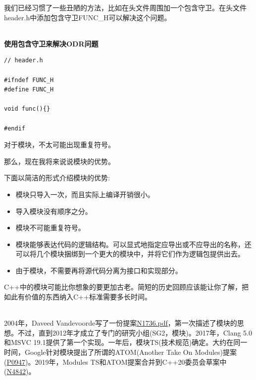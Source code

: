 我们已经习惯了一些丑陋的方法，比如在头文件周围加一个包含守卫。在头文件header.h中添加包含守卫FUNC\_H可以解决这个问题。

\hspace*{\fill} \\ %
\noindent
\textbf{使用包含守卫来解决ODR问题}
\begin{lstlisting}[style=styleCXX]
// header.h

#ifndef FUNC_H
#define FUNC_H

void func(){}

#endif
\end{lstlisting}

对于模块，不太可能出现重复符号。

那么，现在我将来说说模块的优势。


下面以简洁的形式介绍模块的优势:

\begin{itemize}
\item 
模块只导入一次，而且实际上编译开销很小。

\item 
导入模块没有顺序之分。

\item 
模块不可能重复符号。

\item 
模块能够表达代码的逻辑结构。可以显式地指定应导出或不应导出的名称，还可以将几个模块捆绑到一个更大的模块中，并将它们作为逻辑包提供出去。

\item 
由于模块，不需要再将源代码分离为接口和实现部分。
\end{itemize}

\begin{tcolorbox}[breakable,enhanced jigsaw,colback=blue!5!white,colframe=blue!75!black,title=常规类型]
C++中的模块可能比你想象的要更加古老。简短的历史回顾应该能让你了解，把如此有价值的东西纳入C++标准需要多长时间。

\hspace*{\fill} \\ %
2004年，Daveed Vandevoorde写了一份提案\href{http://www.open-std.org/jtc1/sc22/wg21/docs/papers/2004/n1736.pdf}{N1736.pdf}，第一次描述了模块的思想。不过，直到2012年才成立了专门的研究小组(SG2，模块)。2017年，Clang 5.0和MSVC 19.1提供了第一个实现。一年后，模块TS(技术规范)确定。大约在同一时间，Google针对模块提出了所谓的ATOM(Another Take On Modules)提案(\href{http://www.open-std.org/jtc1/sc22/wg21/docs/papers/2018/p0947r1.html}{P0947})。2019年，Modules TS和ATOM提案合并到C++20委员会草案中(\href{https://github.com/cplusplus/draft/releases/tag/n4842}{N4842})。
\end{tcolorbox}


